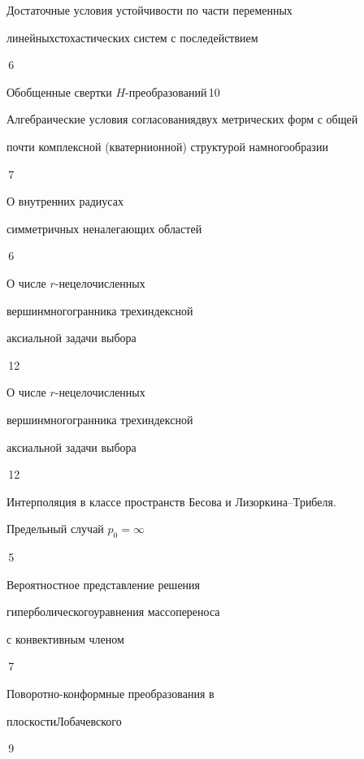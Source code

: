 

{Достаточные условия устойчивости по части переменных


линейных\newline стохастических систем с последействием}{\No\,6}




{Обобщенные свертки $H$-преобразований}{\No\,10}




{Алгебраические условия согласования\newline двух метрических форм с общей


почти комплексной (кватернионной) структурой на\newline многообразии}{\No\,7}




{О внутренних радиусах


симметричных неналегающих областей}{\No\,6}




{О числе $r$-нецелочисленных


вершин\newline многогранника трехиндексной


аксиальной задачи выбора}{\No\,12}




{О числе $r$-нецелочисленных


вершин\newline многогранника трехиндексной


аксиальной задачи выбора}{\No\,12}




{Интерполяция в классе пространств Бесова и Лизоркина--Трибеля.\newline


Предельный случай $p_0=\infty$}{\No\,5}




{Вероятностное представление решения 


гиперболического\newline уравнения массопереноса 


с конвективным членом}{\No\,7}




{Поворотно-конформные преобразования в  


плоскости\newline Лобачевского}{\No\,9}


